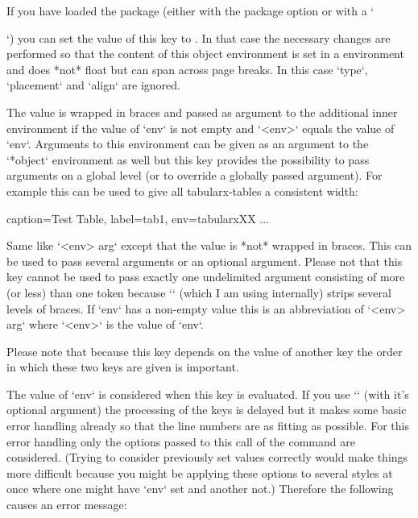   If you have loaded the  package (either with the package option  or with a `\usepackage{longtable}`)
  you can set the value of this key to .
  In that case the necessary changes are performed
  so that the content of this object environment is set in a  environment
  and does *not* float but can span across page breaks.
  In this case `type`, `placement` and `align` are ignored.

  The value is wrapped in braces and passed as argument to the additional inner environment if the value of `env` is not empty and `<env>` equals the value of `env`.
  Arguments to this environment can be given as an argument to the `*object` environment as well but this key provides the possibility to pass arguments on a global level (or to override a globally passed argument).
  For example this can be used to give all tabularx-tables a consistent width:

  \begin{examplecode}

  \begin{tableobject}{caption=Test Table, label=tab1, env=tabularx}{XX}
      ...
  \end{tableobject}
  \end{examplecode}

  Same like `<env> arg` except that the value is *not* wrapped in braces.
  This can be used to pass several arguments or an optional argument.
  Please not that this key cannot be used to pass exactly one undelimited argument consisting of more (or less) than one token because `\pgfkeys` (which I am using internally) strips several levels of braces.
  If `env` has a non-empty value this is an abbreviation of `<env> arg` where `<env>` is the value of `env`.

  Please note that because this key depends on the value of another key the order in which these two keys are given is important.

  The value of `env` is considered when this key is evaluated.
  If you use `` (with it's optional argument) the processing of the keys is delayed but it makes some basic error handling already so that the line numbers are as fitting as possible.
  For this error handling only the options passed to this call of the command are considered.
  (Trying to consider previously set values correctly would make things more difficult because you might be applying these options to several styles at once where one might have `env` set and another not.)
  Therefore the following causes an error message:

